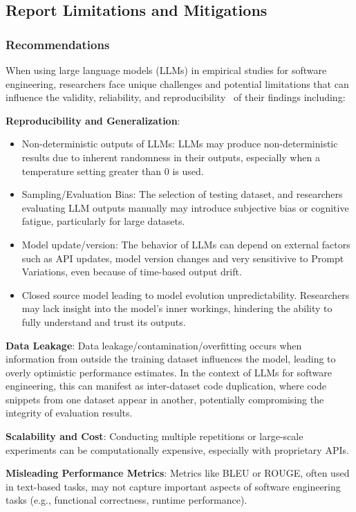\documentclass[11pt]{article}
\begin{document}
\subsection{Report Limitations and Mitigations}

\subsubsection{Recommendations}
When using large language models (LLMs) in empirical studies for software engineering, researchers face unique challenges and potential limitations that can influence the validity, reliability, and reproducibility~\cite{sallou2024breaking} of their findings including:

\textbf{Reproducibility and Generalization}:
\begin{itemize}
  \item Non-deterministic outputs of LLMs: LLMs may produce non-deterministic results due to inherent randomness in their outputs, especially when a temperature setting greater than 0 is used.
  \item Sampling/Evaluation Bias: The selection of testing dataset, and researchers evaluating LLM outputs manually may introduce subjective bias or cognitive fatigue, particularly for large datasets.
  \item Model update/version:  The behavior of LLMs can depend on external factors such as API updates, model version changes and very sensitivive to Prompt Variations, even because of time-based output drift.
  \item Closed source model leading to model evolution unpredictability. Researchers may lack insight into the model's inner workings, hindering the ability to fully understand and trust its outputs.
\end{itemize}

\textbf{Data Leakage}:
Data leakage/contamination/overfitting occurs when information from outside the training dataset influences the model, leading to overly optimistic performance estimates. In the context of LLMs for software engineering, this can manifest as inter-dataset code duplication, where code snippets from one dataset appear in another, potentially compromising the integrity of evaluation results.

\textbf{Scalability and Cost}:
Conducting multiple repetitions or large-scale experiments can be computationally expensive, especially with proprietary APIs.

\textbf{Misleading Performance Metrics}:
Metrics like BLEU or ROUGE, often used in text-based tasks, may not capture important aspects of software engineering tasks (e.g., functional correctness, runtime performance).
\end{document}

